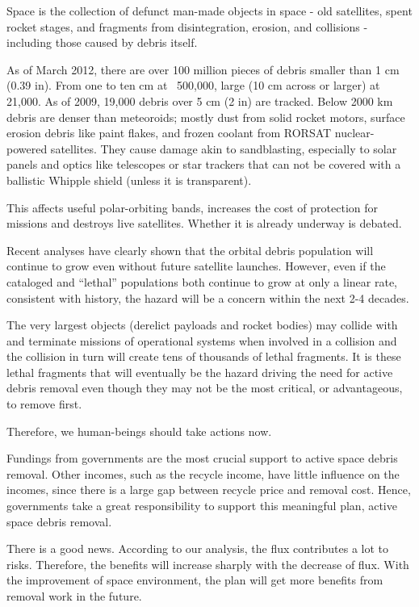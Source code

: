 \documentclass{mcmthesis}
\begin{document}
	Space  is the collection of defunct man-made objects in space - old satellites, spent rocket stages, and fragments from disintegration, erosion, and collisions - including those caused by debris itself.
	
	As of March 2012, there are over 100 million pieces of debris smaller than 1 cm (0.39 in). From one to ten cm at ~500,000, large  (10 cm across or larger) at 21,000. As of 2009, 19,000 debris over 5 cm (2 in) are tracked. Below 2000 km debris are denser than meteoroids; mostly dust from solid rocket motors, surface erosion debris like paint flakes, and frozen coolant from RORSAT nuclear-powered satellites. They cause damage akin to sandblasting, especially to solar panels and optics like telescopes or star trackers that can not be covered with a ballistic Whipple shield (unless it is transparent).
	
	This affects useful polar-orbiting bands, increases the cost of protection for missions and destroys live satellites. Whether it is already underway is debated.
	
	Recent analyses have clearly shown that the orbital debris population will continue to grow even without future satellite launches. However, even if the cataloged and ``lethal'' populations both continue to grow at only a linear rate, consistent with history, the hazard will be a concern within the next 2-4 decades.
	
	The very largest objects (derelict payloads and rocket bodies) may collide with and terminate missions of
	operational systems when involved in a collision and the collision in turn will create tens of thousands of lethal
	fragments. It is these lethal fragments that will eventually be the hazard driving the need for active debris removal
	even though they may not be the most critical, or advantageous, to remove first.
	
	Therefore, we human-beings should take actions now.
	
	Fundings from governments are the most crucial support to active space debris removal. Other incomes, such as the recycle income, have little influence on the incomes, since there is a large gap between recycle price and removal cost. Hence, governments take a great responsibility to support this meaningful plan, active space debris removal.
	
	There is a good news. According to our analysis, the flux contributes a lot to risks. Therefore, the benefits will increase sharply with the decrease of flux. With the improvement of space environment, the plan will get more benefits from removal work in the future.
	
\end{document}

